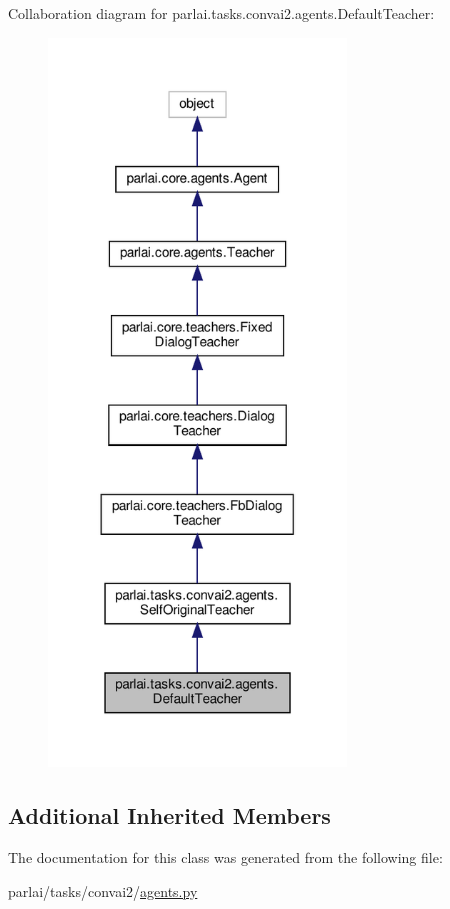 Collaboration diagram for parlai.\+tasks.\+convai2.\+agents.\+Default\+Teacher\+:
\nopagebreak
\begin{figure}[H]
\begin{center}
\leavevmode
\includegraphics[width=224pt]{classparlai_1_1tasks_1_1convai2_1_1agents_1_1DefaultTeacher__coll__graph}
\end{center}
\end{figure}
\subsection*{Additional Inherited Members}


The documentation for this class was generated from the following file\+:\begin{DoxyCompactItemize}
\item 
parlai/tasks/convai2/\hyperlink{parlai_2tasks_2convai2_2agents_8py}{agents.\+py}\end{DoxyCompactItemize}
